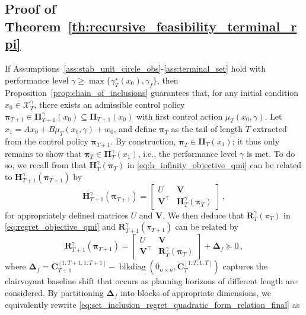 \documentclass[conference]{IEEEtran}
\begin{document}
\subsection{Proof of Theorem~\ref{th:recursive_feasibility_terminal_rpi}}
\label{app:proof_recursive_feasibility_terminal_rpi}
    If Assumptions~\ref{ass:stab_unit_circle_obs}-\ref{ass:terminal_set} hold with performance level $\gamma \geq \operatorname{max}\{\gamma_T^\star(x_0), \gamma_f\}$, then Proposition~\ref{prop:chain_of_inclusions} guarantees that, for any initial condition $x_0 \in \mathcal{X}_T^\gamma$, there exists an admissible control policy $\bm{\pi}_{T+1} \in \bm{\Pi}^\gamma_{T+1}(x_0) \subseteq \bm{\Pi}_{T+1}(x_0)$ with first control action $\mu_T(x_0, \gamma)$. Let $x_1 = A x_0 + B\mu_T(x_0, \gamma) + w_0$, and define $\bm{\pi}_T$ as the tail of length $T$ extracted from the control policy $\bm{\pi}_{T+1}$. By construction, $\bm{\pi}_T \in \bm{\Pi}_T(x_1)$; it thus only remains to show that $\bm{\pi}_T \in \bm{\Pi}_T^\gamma(x_1)$, i.e., the performance level $\gamma$ is met. To do so, we recall from \cite[Lem. 1]{goulart2009control} that $\mathbf{H}_T^\gamma(\bm{\pi}_T)$ in \eqref{eq:h_infinity_objective_qmi} can be related to $\mathbf{H}_{T+1}^\gamma(\bm{\pi}_{T+1})$ by
    \begin{equation}
        \label{eq:set_inclusion_h_infinity_quadratic_form_relation_final}
        \mathbf{H}_{T+1}^\gamma(\bm{\pi}_{T+1}) = \begin{bmatrix}
            U & \mathbf{V}\\
            \mathbf{V}^\top & \mathbf{H}_T^\gamma(\bm{\pi}_T)
        \end{bmatrix}\,,
    \end{equation}
    for appropriately defined matrices $U$ and $\mathbf{V}$. We then deduce that $\mathbf{R}_T^\gamma(\pi_T)$ in \eqref{eq:regret_objective_qmi} and $\mathbf{R}_{T+1}^\gamma(\pi_{T+1})$ can be related by
    \begin{equation}
        \label{eq:set_inclusion_regret_quadratic_form_relation_final}
        \mathbf{R}_{T+1}^\gamma(\bm{\pi}_{T+1}) = \begin{bmatrix}
            U & \mathbf{V}\\
            \mathbf{V}^\top & \mathbf{R}_T^\gamma(\bm{\pi}_{T})
        \end{bmatrix}
        +
        \bm{\Delta}_f \succeq 0\,,
    \end{equation}
    where $\bm{\Delta}_f = \mathbf{C}_{T+1}^{[1:T+1, 1:T+1]} - \operatorname{blkdiag}(0_{n \times n}, \mathbf{C}_{T}^{[1:T, 1:T]})$ captures the clairvoyant baseline shift that occurs as planning horizons of different length are considered. By partitioning $\bm{\Delta}_f$ into blocks of appropriate dimensions, we equivalently rewrite \eqref{eq:set_inclusion_regret_quadratic_form_relation_final} as
\end{document}
